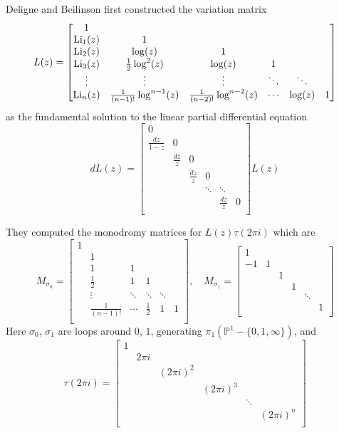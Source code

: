 Deligne and Beilinson first constructed the variation matrix
\begin{equation}\label{eq: Deligne's variation matrix}
L(z)=\begin{bmatrix}
1\\
\operatorname{Li}_1(z)&1\\
\operatorname{Li}_2(z)&\log(z)&1\\
\operatorname{Li}_3(z)&\frac{1}{2}\log^2(z)&\log(z)&1\\
\vdots&\vdots&\vdots&\ddots&\ddots\\
\operatorname{Li}_n(z)&\frac{1}{(n-1)!}\log^{n-1}(z)&\frac{1}{(n-2)!}\log^{n-2}(z)&\cdots&\log(z)&1\\
\end{bmatrix}
\end{equation}
as the fundamental solution to the linear partial differential equation
\begin{equation}\label{eq: }
dL(z)=\begin{bmatrix}
0\\
\frac{dz}{1-z}&0\\
&\frac{dz}{z}&0\\
&&\frac{dz}{z}&0\\
&&&\ddots&\ddots\\
&&&&\frac{dz}{z}&0\\
\end{bmatrix}L(z)
\end{equation}

They computed the monodromy matrices for $L(z)\tau(2\pi i)$ which are
\begin{equation}
M_{\sigma_0}=\begin{bmatrix}
1\\
&1\\
&1&1\\
&\frac{1}{2}&1&1\\
&\vdots&\ddots&\ddots&\ddots\\
&\frac{1}{(n-1)!}&\cdots&\frac{1}{2}&1&1\\
\end{bmatrix},\quad M_{\sigma_1}=\begin{bmatrix}
1\\
-1&1\\
&&1\\
&&&1\\
&&&&\ddots\\
&&&&&1\\
\end{bmatrix}
\end{equation}
Here $\sigma_0$, $\sigma_1$ are loops around $0$, $1$, generating $\pi_1(\mathbb P^1-\{0,1,\infty\})$, and
\[
\tau(2\pi i)=\begin{bmatrix}
1\\
&2\pi i\\
&&(2\pi i)^2\\
&&&(2\pi i)^3\\
&&&&\ddots\\
&&&&&(2\pi i)^n\\
\end{bmatrix}
\]

